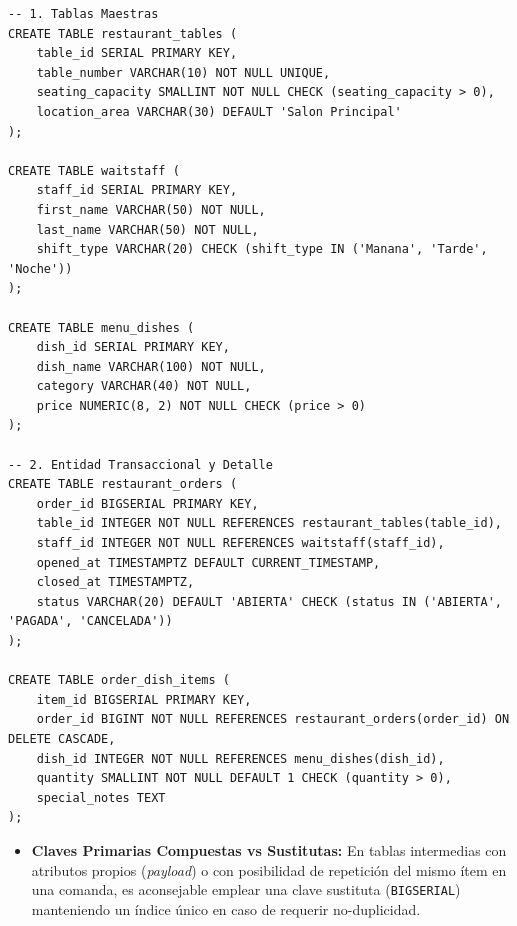 \begin{lstlisting}[style=sqlstyle, caption={Esquema DDL completo para sistema de restaurantes}]
-- 1. Tablas Maestras
CREATE TABLE restaurant_tables (
    table_id SERIAL PRIMARY KEY,
    table_number VARCHAR(10) NOT NULL UNIQUE,
    seating_capacity SMALLINT NOT NULL CHECK (seating_capacity > 0),
    location_area VARCHAR(30) DEFAULT 'Salon Principal'
);

CREATE TABLE waitstaff (
    staff_id SERIAL PRIMARY KEY,
    first_name VARCHAR(50) NOT NULL,
    last_name VARCHAR(50) NOT NULL,
    shift_type VARCHAR(20) CHECK (shift_type IN ('Manana', 'Tarde', 'Noche'))
);

CREATE TABLE menu_dishes (
    dish_id SERIAL PRIMARY KEY,
    dish_name VARCHAR(100) NOT NULL,
    category VARCHAR(40) NOT NULL,
    price NUMERIC(8, 2) NOT NULL CHECK (price > 0)
);

-- 2. Entidad Transaccional y Detalle
CREATE TABLE restaurant_orders (
    order_id BIGSERIAL PRIMARY KEY,
    table_id INTEGER NOT NULL REFERENCES restaurant_tables(table_id),
    staff_id INTEGER NOT NULL REFERENCES waitstaff(staff_id),
    opened_at TIMESTAMPTZ DEFAULT CURRENT_TIMESTAMP,
    closed_at TIMESTAMPTZ,
    status VARCHAR(20) DEFAULT 'ABIERTA' CHECK (status IN ('ABIERTA', 'PAGADA', 'CANCELADA'))
);

CREATE TABLE order_dish_items (
    item_id BIGSERIAL PRIMARY KEY,
    order_id BIGINT NOT NULL REFERENCES restaurant_orders(order_id) ON DELETE CASCADE,
    dish_id INTEGER NOT NULL REFERENCES menu_dishes(dish_id),
    quantity SMALLINT NOT NULL DEFAULT 1 CHECK (quantity > 0),
    special_notes TEXT
);
\end{lstlisting}

\begin{engtip}
\begin{itemize}
    \item \textbf{Claves Primarias Compuestas vs Sustitutas:} En tablas intermedias con atributos propios (\textit{payload}) o con posibilidad de repetici\'on del mismo \'item en una comanda, es aconsejable emplear una clave sustituta (\texttt{BIGSERIAL}) manteniendo un \'indice \'unico en caso de requerir no-duplicidad.
\end{itemize}
\end{engtip}
